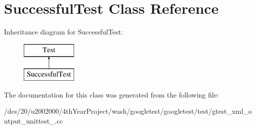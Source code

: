 \hypertarget{classSuccessfulTest}{}\section{Successful\+Test Class Reference}
\label{classSuccessfulTest}
Inheritance diagram for Successful\+Test\+:\begin{figure}[H]
\begin{center}
\leavevmode
\includegraphics[height=2.000000cm]{classSuccessfulTest}
\end{center}
\end{figure}


The documentation for this class was generated from the following file\+:\begin{DoxyCompactItemize}
\item 
/dcs/20/u2002000/4th\+Year\+Project/wash/googletest/googletest/test/gtest\+\_\+xml\+\_\+output\+\_\+unittest\+\_\+.\+cc\end{DoxyCompactItemize}
